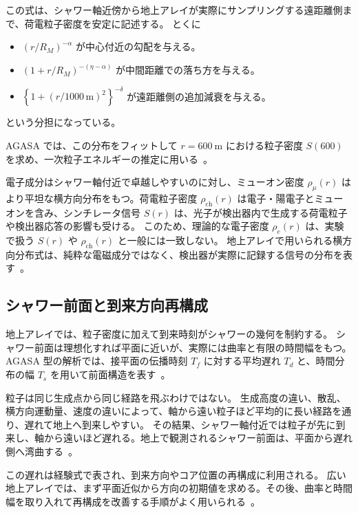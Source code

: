 \documentclass[book,paper=a4,fontsize=11pt]{jlreq}
\begin{document}
この式は、シャワー軸近傍から地上アレイが実際にサンプリングする遠距離側まで、荷電粒子密度を安定に記述する。
とくに
\begin{itemize}
  \item \(\left(r/R_M\right)^{-\alpha}\) が中心付近の勾配を与える。
  \item \(\left(1+r/R_M\right)^{-(\eta-\alpha)}\) が中間距離での落ち方を与える。
  \item \(\left\{1+(r/1000\,\mathrm{m})^2\right\}^{-\delta}\) が遠距離側の追加減衰を与える。
\end{itemize}
という分担になっている。

AGASA では、この分布をフィットして \(r=600\ \mathrm{m}\) における粒子密度 \(S(600)\) を求め、一次粒子エネルギーの推定に用いる~\cite{Takeda2003}。

電子成分はシャワー軸付近で卓越しやすいのに対し、ミューオン密度 \(\rho_\mu(r)\) はより平坦な横方向分布をもつ。荷電粒子密度 \(\rho_{\mathrm{ch}}(r)\) は電子・陽電子とミューオンを含み、シンチレータ信号 \(S(r)\) は、光子が検出器内で生成する荷電粒子や検出器応答の影響も受ける。
このため、理論的な電子密度 \(\rho_e(r)\) は、実験で扱う \(S(r)\) や \(\rho_{\mathrm{ch}}(r)\) と一般には一致しない。
地上アレイで用いられる横方向分布式は、純粋な電磁成分ではなく、検出器が実際に記録する信号の分布を表す~\cite{Teshima1986,Yoshida1994,Takeda2003,Cazon2004}。

\subsection{シャワー前面と到来方向再構成}\label{subsec:shower_front}
地上アレイでは、粒子密度に加えて到来時刻がシャワーの幾何を制約する。
シャワー前面は理想化すれば平面に近いが、実際には曲率と有限の時間幅をもつ。
AGASA 型の解析では、接平面の伝播時刻 \(T_f\) に対する平均遅れ \(T_d\) と、時間分布の幅 \(T_s\) を用いて前面構造を表す~\cite{LinsleyScarsi1962,Teshima1986,Takeda2003}。

粒子は同じ生成点から同じ経路を飛ぶわけではない。
生成高度の違い、散乱、横方向運動量、速度の違いによって、軸から遠い粒子ほど平均的に長い経路を通り、遅れて地上へ到来しやすい。
その結果、シャワー軸付近では粒子が先に到来し、軸から遠いほど遅れる。地上で観測されるシャワー前面は、平面から遅れ側へ湾曲する~\cite{LinsleyScarsi1962,Cazon2004}。

この遅れは経験式で表され、到来方向やコア位置の再構成に利用される。
広い地上アレイでは、まず平面近似から方向の初期値を求める。その後、曲率と時間幅を取り入れて再構成を改善する手順がよく用いられる~\cite{LinsleyScarsi1962,Teshima1986,Takeda2003}。
\end{document}
